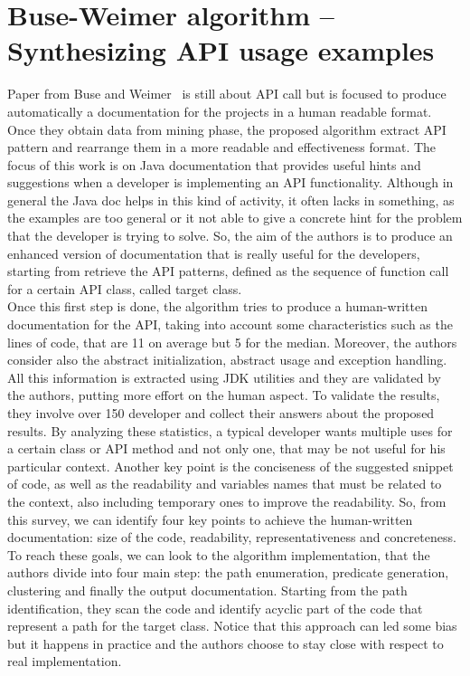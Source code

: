 \section{Buse-Weimer algorithm -- Synthesizing API usage examples}
Paper from Buse and Weimer~\cite{buse_synthesizing_2012} is still about API call but is focused to produce automatically a documentation for the projects in a human readable format.
Once they obtain data from mining phase, the proposed algorithm extract API pattern and rearrange them in a more readable and effectiveness format. The focus of this work is on Java documentation that provides useful hints and suggestions when a developer is implementing an API functionality. Although in general the Java doc helps in this kind of activity, it often lacks in something, as the examples are too general or it not able to give a concrete hint for the problem that the developer is trying to solve. So, the aim of the authors is to produce an enhanced version of documentation that is really useful for the developers, starting from retrieve the API patterns, defined as the sequence of function call for a certain API class, called target class. \\
Once this first step is done, the algorithm tries to produce a human-written documentation for the API, taking into account some characteristics such as the lines of code, that are 11 on average but 5 for the median. Moreover, the authors consider also the abstract initialization, abstract usage and exception handling. All this information is extracted using JDK utilities and they are validated by the authors, putting more effort on the human aspect. To validate the results, they involve over 150 developer and collect their answers about the proposed results. By analyzing these statistics, a typical developer wants multiple uses for a certain class or API method and not only one, that may be not useful for his particular context. Another key point is the conciseness of the suggested snippet of code, as well as the readability and variables names that must be related to the context, also including temporary ones to improve the readability. So, from this survey, we can identify four key points to achieve the human-written documentation: size of the code, readability, representativeness and concreteness.\newline
To reach these goals, we can look to the algorithm implementation, that the authors divide into four main step: the path enumeration, predicate generation, clustering and finally the output documentation. Starting from the path identification, they scan the code and identify acyclic part of the code that represent a path for the target class. Notice that this approach can led some bias but it happens in practice and the authors choose to stay close with respect to real implementation. \\
